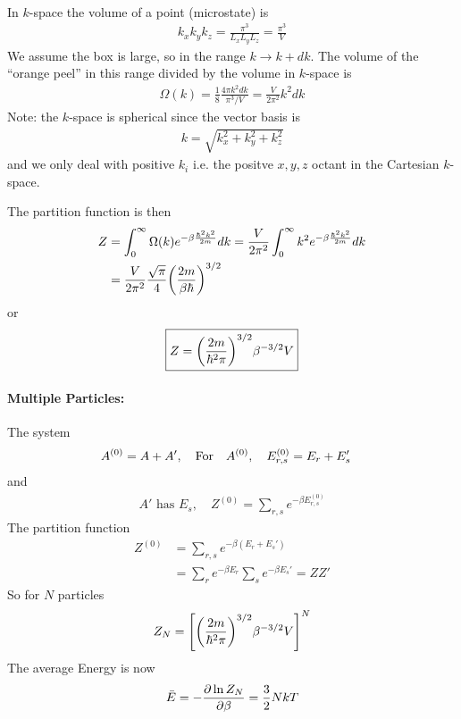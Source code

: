 \documentclass[../main.tex]{subfiles}
\begin{document}
\paragraph{} In $k$-space the volume of a point (microstate) is 
\begin{align*}
    k_x k_y k_z = \frac{\pi^3}{L_x L_y L_z} = \frac{\pi^3}{V}
\end{align*}
We assume the box is large, so in the range $k \to k + dk$. The volume of the ``orange peel'' in this range divided by the volume in $k$-space is
\begin{align*}
    \Omega(k) = \frac{1}{8} \frac{4\pi k^2 dk}{\pi^3 / V} = \frac{V}{2\pi^2} k^2 dk
\end{align*}
Note: the $k$-space is spherical since the vector basis is
\begin{align*}
    k = \sqrt{k_x^2 + k_y^2 + k_z^2}
\end{align*}
and we only deal with positive $k_i$ i.e. the positve $x,y,z$ octant in the Cartesian $k$-space.

The partition function is then
\begin{align*}
    Z &= \int_0^\infty \Omega(k) e^{-\beta \frac{\hbar^2 k^2}{2m}} dk = \frac{V}{2\pi^2} \int_0^\infty k^2 e^{-\beta \frac{\hbar^2 k^2}{2m}} dk \\
    &= \frac{V}{2\pi^2} \frac{\sqrt{\pi}}{4} \qt(\frac{2m}{\beta\hbar})^{3/2} 
\end{align*}
or
\begin{align*}
    \boxed{
        Z = \qt(\frac{2m}{\hbar^2\pi})^{3/2} \beta^{-3/2} V
    }
\end{align*}

\paragraph{Multiple Particles:} The system
\begin{align*}
    A^{(0)} &= A + A', \qqtext{For} A^{(0)}, \quad E_{r,s}^{(0)} = E_r + E_s'
\end{align*}
and
\begin{align*}
    A' \text{ has } E_s, \quad Z^{(0)} = \sum_{r,s} e^{-\beta E_{r,s}^{(0)}}
\end{align*}
The partition function
\begin{align*}
    Z^{(0)} &= \sum_{r,s} e^{-\beta(E_r + E_s')} \\
    &= \sum_r e^{-\beta E_r} \sum_s e^{-\beta E_s'} = Z Z'
\end{align*}
So for $N$ particles
\begin{align*}
    Z_N = \qt[
        \qt(\frac{2m}{\hbar^2\pi})^{3/2} \beta^{-3/2} V
    ]^N
\end{align*}
The average Energy is now
\begin{align*}
    \bar E = -\pdv{\ln Z_N}{\beta} = \frac{3}{2} N kT
\end{align*}
\end{document}
